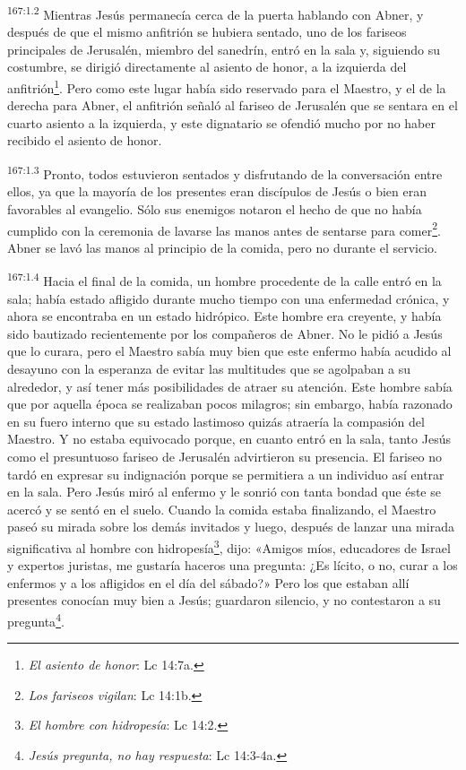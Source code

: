 \par
\textsuperscript{167:1.2} Mientras Jesús permanecía cerca de la puerta hablando con Abner, y después de que el mismo anfitrión se hubiera sentado, uno de los fariseos principales de Jerusalén, miembro del sanedrín, entró en la sala y, siguiendo su costumbre, se dirigió directamente al asiento de honor, a la izquierda del anfitrión\footnote{\textit{El asiento de honor}: Lc 14:7a.}. Pero como este lugar había sido reservado para el Maestro, y el de la derecha para Abner, el anfitrión señaló al fariseo de Jerusalén que se sentara en el cuarto asiento a la izquierda, y este dignatario se ofendió mucho por no haber recibido el asiento de honor.

\par
\textsuperscript{167:1.3} Pronto, todos estuvieron sentados y disfrutando de la conversación entre ellos, ya que la mayoría de los presentes eran discípulos de Jesús o bien eran favorables al evangelio. Sólo sus enemigos notaron el hecho de que no había cumplido con la ceremonia de lavarse las manos antes de sentarse para comer\footnote{\textit{Los fariseos vigilan}: Lc 14:1b.}. Abner se lavó las manos al principio de la comida, pero no durante el servicio.

\par
\textsuperscript{167:1.4} Hacia el final de la comida, un hombre procedente de la calle entró en la sala; había estado afligido durante mucho tiempo con una enfermedad crónica, y ahora se encontraba en un estado hidrópico. Este hombre era creyente, y había sido bautizado recientemente por los compañeros de Abner. No le pidió a Jesús que lo curara, pero el Maestro sabía muy bien que este enfermo había acudido al desayuno con la esperanza de evitar las multitudes que se agolpaban a su alrededor, y así tener más posibilidades de atraer su atención. Este hombre sabía que por aquella época se realizaban pocos milagros; sin embargo, había razonado en su fuero interno que su estado lastimoso quizás atraería la compasión del Maestro. Y no estaba equivocado porque, en cuanto entró en la sala, tanto Jesús como el presuntuoso fariseo de Jerusalén advirtieron su presencia. El fariseo no tardó en expresar su indignación porque se permitiera a un individuo así entrar en la sala. Pero Jesús miró al enfermo y le sonrió con tanta bondad que éste se acercó y se sentó en el suelo. Cuando la comida estaba finalizando, el Maestro paseó su mirada sobre los demás invitados y luego, después de lanzar una mirada significativa al hombre con hidropesía\footnote{\textit{El hombre con hidropesía}: Lc 14:2.}, dijo: «Amigos míos, educadores de Israel y expertos juristas, me gustaría haceros una pregunta: ¿Es lícito, o no, curar a los enfermos y a los afligidos en el día del sábado?» Pero los que estaban allí presentes conocían muy bien a Jesús; guardaron silencio, y no contestaron a su pregunta\footnote{\textit{Jesús pregunta, no hay respuesta}: Lc 14:3-4a.}.

